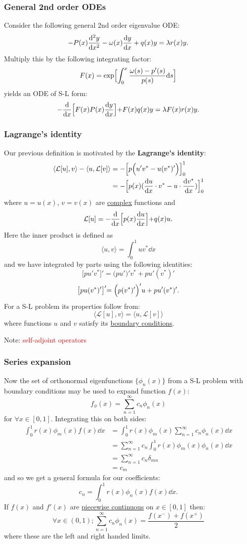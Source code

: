 \documentclass{article}
\begin{document}
\newpage

\subsubsection{General 2nd order ODEs}
Consider the following general 2nd order eigenvalue ODE:
$$-P(x)\dv[2]{y}{x}-\omega(x)\dv{y}{x}+q(x)y=\lambda r(x)y.$$
Multiply this by the following integrating factor:
$$F(x)=\exp\Bigl[\int_{0}^{x}
\frac{\omega(s)-p'(s)}{p(s)}\dd s\Bigl]$$
yields an ODE of S-L form:
$$-\dv{x}\Bigl[F(x)P(x)\dv{y}{x}\Bigl]
+F(x)q(x)y=\lambda F(x)r(x)y.$$

\subsubsection{Lagrange's identity}
Our previous definition is motivated by the \textbf{Lagrange's identity}:
\begin{align*}
    \langle \mathcal{L}[u], v \rangle - \langle u, \mathcal{L}[v] \rangle
    &=-\Bigl[p\Bigl(u'v^*-u(v^*)'\Bigl)\Bigl]_{0}^{1} \\
    &=-\Bigl[p(x)(\dv{u}{x}\cdot v^*-u\cdot\dv{v^*}{x})\Bigl]_{0}^{1}
\end{align*}
where $u=u(x)$, $v=v(x)$ are \underline{complex} functions and
$$\mathcal{L}[u]=-\dv{x}\Bigl[p(x)\dv{u}{x}\Bigl]+q(x)u.$$
Here the inner product is defined as
$$\langle u,v \rangle=\int_{0}^{1}uv^* \dd x$$
and we have integrated by parts using the following identities:
$$\bigl[pu'v^*\bigl]'=\bigl(pu'\bigl)'v^*+pu'(v^*)'$$
$$\bigl[pu(v^*)'\bigl]'=\Bigl(p(v^*)'\Bigl)'u+pu'(v^*)'.$$
For a S-L problem its properties follow from:
$$\langle \mathcal{L}[u], v \rangle=\langle u, \mathcal{L}[v] \rangle$$
where functions $u$ and $v$
satisfy its \underline{boundary conditions}.

Note: \textcolor{red}{self-adjoint operators}

\newpage

\subsubsection{Series expansion}
Now the set of orthonormal eigenfunctions $\{\phi_n(x)\}$
from a S-L problem with boundary conditions
may be used to expand function $f(x)$:
$$f_\phi(x)=\sum_{n=1}^{\infty} c_n\phi_n(x)$$
for $\forall x\in[0,1]$. Integrating this on both sides:
\begin{align*}
    \int_{0}^{1}r(x)\phi_m(x)f(x)\dd x
    &=\int_{0}^{1}r(x)\phi_m(x)
    \sum_{n=1}^{\infty} c_n\phi_n(x)\dd x \\
    &=\sum_{n=1}^{\infty} c_n
    \int_{0}^{1}r(x)\phi_m(x)\phi_n(x)\dd x \\
    &=\sum_{n=1}^{\infty} c_n\delta_{mn} \\
    &=c_m
\end{align*}
and so we get a general formula for our coefficients:
$$c_n=\int_{0}^{1}r(x)\phi_n(x)f(x)\dd x.$$
If $f(x)$ and $f'(x)$ are \underline{piecewise continuous}
on $x\in[0,1]$ then:
$$\forall x\in(0,1);\sum_{n=1}^{\infty} c_n\phi_n(x)
=\frac{f(x^-)+f(x^+)}{2}$$
where these are the left and right handed limits.
\end{document}
